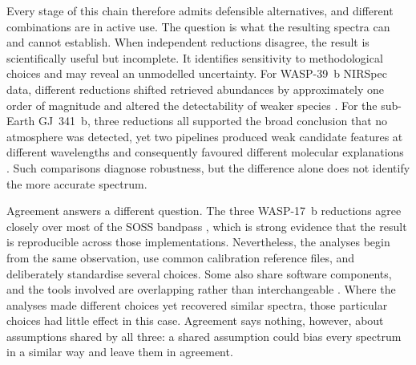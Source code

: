 
Every stage of this chain therefore admits defensible alternatives, and
different combinations are in active use. The question is what the resulting
spectra can and cannot establish. When independent reductions disagree, the
result is scientifically useful but incomplete. It identifies sensitivity to
methodological choices and may reveal an unmodelled uncertainty. For
WASP-39~b NIRSpec data, different reductions shifted retrieved abundances by
approximately one order of magnitude and altered the detectability of weaker
species \citep{ConstantinouEtAl2023}. For the sub-Earth
GJ~341~b, three reductions all supported the broad conclusion that no atmosphere
was detected, yet two pipelines produced weak candidate features at different
wavelengths and consequently favoured different molecular explanations
\citep{KirkEtAl2024}. Such comparisons diagnose robustness, but the difference
alone does not identify the more accurate spectrum.


Agreement answers a different question. The three WASP-17~b reductions agree
closely over most of the SOSS bandpass \citep{LouieEtAl2025}, which is strong
evidence that the result is reproducible across those implementations.
Nevertheless, the analyses begin from the same observation, use common
calibration reference files, and deliberately standardise several choices.
Some also share software components, and the tools involved are overlapping
rather than interchangeable
\citep{BellEtAl2022,RadicaEtAl2023,LouieEtAl2025}. Where the analyses made
different choices yet recovered similar spectra, those particular choices had
little effect in this case. Agreement says nothing, however, about assumptions
shared by all three: a shared assumption could bias every spectrum in a
similar way and leave them in agreement.


